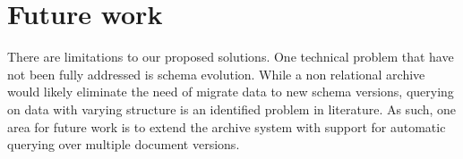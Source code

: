\section{Future work}
There are limitations to our proposed solutions. One technical problem that have not been fully addressed is schema evolution. While a non relational archive would likely eliminate the need of migrate data to new schema versions, querying on data with varying structure is an identified problem in literature. As such, one area for future work is to extend the archive system with support for automatic querying over multiple document versions.